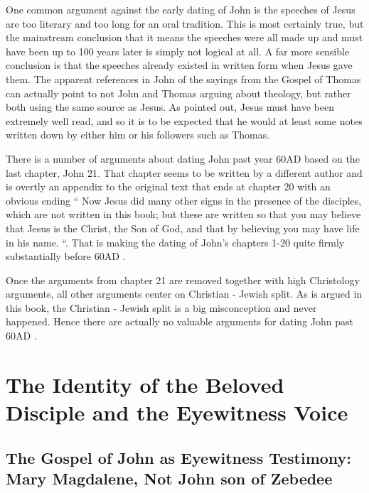 One common argument against the early dating of John is the speeches of Jesus are too literary and too long for an oral tradition.
This is most certainly true, but the mainstream conclusion that it means the speeches were all made up and must have been up to 100 years later is simply not logical at all.
A far more sensible conclusion is that the speeches already existed in written form when Jesus gave them.
The apparent references in John of the sayings from the Gospel of Thomas can actually point to not John and Thomas arguing about theology, but rather both using the same source as Jesus.
As pointed out, Jesus must have been extremely well read, and so it is to be expected that he would at least some notes written down by either him or his followers such as Thomas.

There is a number of arguments about dating John past year 60AD based on the last chapter, John 21.
That chapter seems to be written by a different author and is overtly an appendix to the original text that ends at chapter 20 with an obvious ending ``
Now Jesus did many other signs in the presence of the disciples, which are not written in this book;
but these are written so that you may believe that Jesus is the Christ, the Son of God, and that by believing you may have life in his name.
``.
That is making the dating of John's chapters 1-20 quite firmly substantially before 60AD .

Once the arguments from chapter 21 are removed together with high Christology arguments, all other arguments center on Christian - Jewish split.
As is argued in this book, the Christian - Jewish split is a big misconception and never happened.
Hence there are actually no valuable arguments for dating John past 60AD .

\section{The Identity of the Beloved Disciple and the Eyewitness Voice}\label{sec:identity-beloved-disciple}

\subsection{The Gospel of John as Eyewitness Testimony: Mary Magdalene, Not John son of Zebedee}\label{subsec:the-gospel-of-john-is-widely-accepted-to-be-one-gospel-that-indicates-it-was-written-by-an-eyewitness.}

